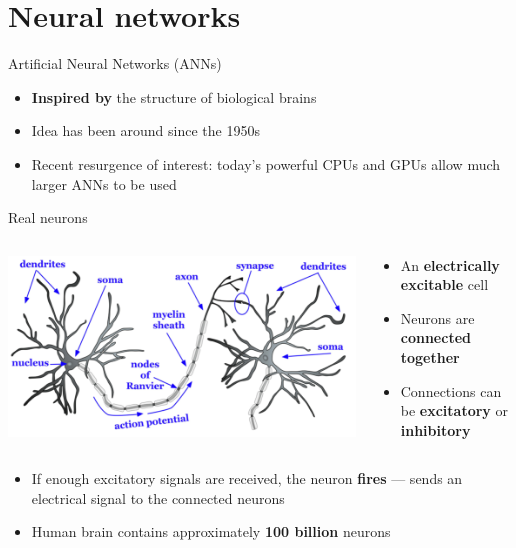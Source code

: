 \part{Neural networks}
\frame{\partpage}

\begin{frame}{Artificial Neural Networks (ANNs)}
	\begin{itemize}
		\pause\item \textbf{Inspired by} the structure of biological brains
		\pause\item Idea has been around since the 1950s
		\pause\item Recent resurgence of interest: today's powerful CPUs and GPUs allow much larger ANNs to be used
	\end{itemize}
\end{frame}

\begin{frame}{Real neurons}
	\begin{columns}
		\begin{column}{0.48\textwidth}
			\includegraphics[width=\textwidth]{neuron}
		\end{column}
		\begin{column}{0.48\textwidth}
			\begin{itemize}
				\pause\item An \textbf{electrically excitable} cell
				\pause\item Neurons are \textbf{connected together}
				\pause\item Connections can be \textbf{excitatory} or \textbf{inhibitory}
			\end{itemize}
		\end{column}
	\end{columns}
	\begin{itemize}
		\pause\item If enough excitatory signals are received, the neuron \textbf{fires} ---
			sends an electrical signal to the connected neurons
		\pause\item Human brain contains approximately \textbf{100 billion} neurons
	\end{itemize}
\end{frame}

